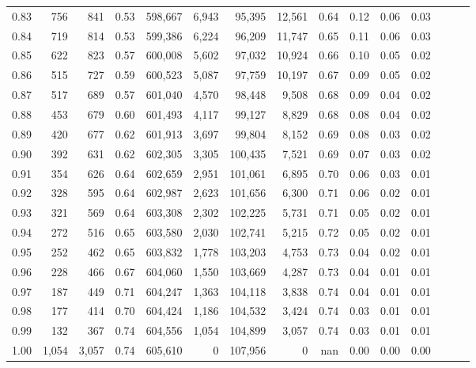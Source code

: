 \begin{tabular}{rrrrrrrrrrrrrrr}
0.83 &     756 &    841 &  0.53 &  598,667 &    6,943 &   95,395 &   12,561 &  0.64 &  0.12 &  0.06 &      0.03 \\
0.84 &     719 &    814 &  0.53 &  599,386 &    6,224 &   96,209 &   11,747 &  0.65 &  0.11 &  0.06 &      0.03 \\
0.85 &     622 &    823 &  0.57 &  600,008 &    5,602 &   97,032 &   10,924 &  0.66 &  0.10 &  0.05 &      0.02 \\
0.86 &     515 &    727 &  0.59 &  600,523 &    5,087 &   97,759 &   10,197 &  0.67 &  0.09 &  0.05 &      0.02 \\
0.87 &     517 &    689 &  0.57 &  601,040 &    4,570 &   98,448 &    9,508 &  0.68 &  0.09 &  0.04 &      0.02 \\
0.88 &     453 &    679 &  0.60 &  601,493 &    4,117 &   99,127 &    8,829 &  0.68 &  0.08 &  0.04 &      0.02 \\
0.89 &     420 &    677 &  0.62 &  601,913 &    3,697 &   99,804 &    8,152 &  0.69 &  0.08 &  0.03 &      0.02 \\
0.90 &     392 &    631 &  0.62 &  602,305 &    3,305 &  100,435 &    7,521 &  0.69 &  0.07 &  0.03 &      0.02 \\
0.91 &     354 &    626 &  0.64 &  602,659 &    2,951 &  101,061 &    6,895 &  0.70 &  0.06 &  0.03 &      0.01 \\
0.92 &     328 &    595 &  0.64 &  602,987 &    2,623 &  101,656 &    6,300 &  0.71 &  0.06 &  0.02 &      0.01 \\
0.93 &     321 &    569 &  0.64 &  603,308 &    2,302 &  102,225 &    5,731 &  0.71 &  0.05 &  0.02 &      0.01 \\
0.94 &     272 &    516 &  0.65 &  603,580 &    2,030 &  102,741 &    5,215 &  0.72 &  0.05 &  0.02 &      0.01 \\
0.95 &     252 &    462 &  0.65 &  603,832 &    1,778 &  103,203 &    4,753 &  0.73 &  0.04 &  0.02 &      0.01 \\
0.96 &     228 &    466 &  0.67 &  604,060 &    1,550 &  103,669 &    4,287 &  0.73 &  0.04 &  0.01 &      0.01 \\
0.97 &     187 &    449 &  0.71 &  604,247 &    1,363 &  104,118 &    3,838 &  0.74 &  0.04 &  0.01 &      0.01 \\
0.98 &     177 &    414 &  0.70 &  604,424 &    1,186 &  104,532 &    3,424 &  0.74 &  0.03 &  0.01 &      0.01 \\
0.99 &     132 &    367 &  0.74 &  604,556 &    1,054 &  104,899 &    3,057 &  0.74 &  0.03 &  0.01 &      0.01 \\
1.00 &   1,054 &  3,057 &  0.74 &  605,610 &        0 &  107,956 &        0 &   nan &  0.00 &  0.00 &      0.00 \\
\bottomrule
\end{tabular}
